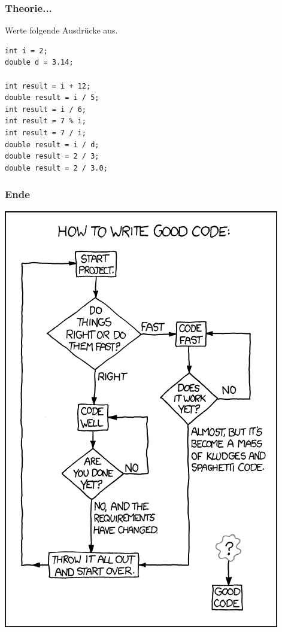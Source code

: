 \documentclass{beamer}
\begin{document}
\begin{frame}[fragile]
\frametitle{Theorie...}
Werte folgende Ausdr\"{u}cke aus.
\begin{verbatim}
int i = 2;
double d = 3.14;

int result = i + 12;
double result = i / 5;
int result = i / 6;
int result = 7 % i;
int result = 7 / i;
double result = i / d;
double result = 2 / 3;
double result = 2 / 3.0;
\end{verbatim}
\end{frame}

\begin{frame}
\frametitle{Ende}
\includegraphics[scale=0.28]{good_code.png}
\end{frame}
\end{document}

